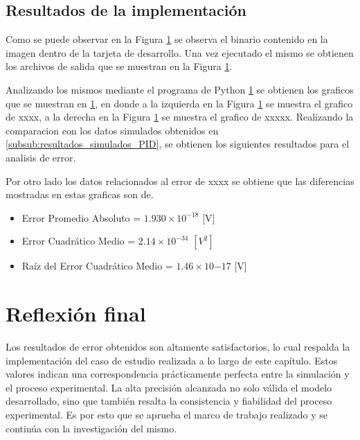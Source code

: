 \subsection{Resultados de la implementación}

Como se puede observar en la Figura \ref{} se observa el binario contenido en la imagen dentro de la tarjeta de desarrollo. Una vez ejecutado el mismo se obtienen los archivos de salida que se muestran en la Figura \ref{}. 


Analizando los mismos mediante el programa de Python \ref{} se obtienen los graficos que se muestran en \ref{}, en donde a la izquierda en la Figura \ref{} se muestra el grafico de xxxx, a la derecha en la Figura \ref{} se muestra el grafico de xxxxx. Realizando la comparacion con los datos simulados obtenidos en \ref{subsub:resultados_simulados_PID}, se obtienen los siguientes resultados para el analisis de error.


Por otro lado los datos relacionados al error de xxxx se obtiene que las diferencias mostradas en estas graficas son de.


\begin{itemize}
    \item Error Promedio Absoluto = $1.930 \times 10^{-18}$ [V]
    \item Error Cuadrático Medio = $2.14 \times 10^{-34}$ $[V^{2}]$
    \item Raíz del Error Cuadrático Medio = $1.46 \times 10{-17}$ [V]
\end{itemize}


\section{Reflexión final}

Los resultados de error obtenidos son altamente satisfactorios, lo cual respalda la implementación del caso de estudio realizada a lo largo de este capítulo. Estos valores indican una correspondencia prácticamente perfecta entre la simulación y el proceso experimental. La alta precisión alcanzada no solo válida el modelo desarrollado, sino que también resalta la consistencia y fiabilidad del proceso experimental. Es por esto que se aprueba el marco de trabajo realizado y se continúa con la investigación del mismo.